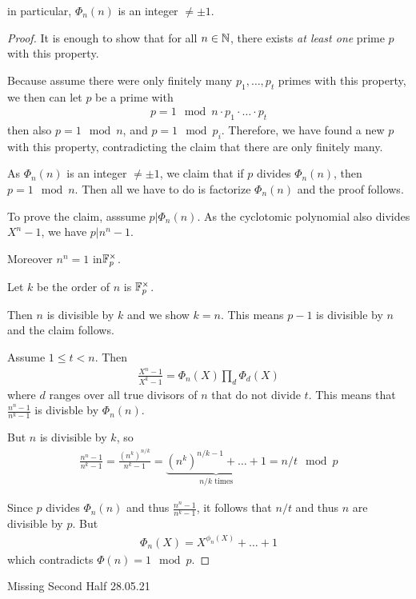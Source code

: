 in particular, $\Phi_n(n)$ is an integer $\neq \pm 1$.

\begin{proof}
It is enough to show that for all $n \in \mathbb{N}$, there exists \emph{at least one} prime $p$ with this property.

Because assume there were only finitely many $p_1,\ldots,p_t$ primes with this property, we then can let $p$ be a prime with
\begin{align*}
  p = 1 \mod n \cdot p_1 \cdot \ldots \cdot p_t
\end{align*}
then also $p = 1 \mod n$, and $p = 1 \mod p_i$.
Therefore, we have found a new $p$ with this property, contradicting the claim that there are only finitely many.

As $\Phi_n(n)$ is an integer $\neq \pm 1$, we claim that if $p$ divides $\Phi_n(n)$, then
$p = 1 \mod n$.
Then all we have to do is factorize $\Phi_n(n)$ and the proof follows.

To prove the claim, asssume $p | \Phi_n(n)$. As the cyclotomic polynomial also divides $X^{n}-1$, we have $p | n^{n} -1$.

Moreover $n^{n} = 1$ in$\mathbb{F}_p^{\times}$.

Let $k$ be the order of $n$ is $\mathbb{F}_p^{\times}$.

Then $n$ is divisible by $k$ and we show $k = n$.
This means $p-1$ is divisible by $n$ and the claim follows.

Assume $1 \leq t < n$. Then
\begin{align*}
  \frac{X^{n}-1}{X^{k}-1} = \Phi_n(X) \prod_{d} \Phi_d(X)
\end{align*}
where $d$ ranges over all true divisors of $n$ that do not divide $t$.
This means that
$\frac{n^{n}-1}{n^{k}-1}$ is divisble by $\Phi_n(n)$.

But $n$ is divisible by $k$, so
\begin{align*}
  \frac{n^{n}-1}{n^{k}-1} = \frac{(n^{k})^{n/k}}{n^{k}-1}= \underbrace{(n^{k})^{n/k - 1} + \ldots + 1}_{n/k \text{ times}}
  = n/t \mod p
\end{align*}

Since $p$ divides $\Phi_n(n)$ and thus $\frac{n^{n}-1}{n^{k}-1}$, it follows that $n/t$ and thus $n$ are divisible by $p$.
But
\begin{align*}
  \Phi_n(X) = X^{\phi_n(X)} + \ldots + 1
\end{align*}
which contradicts $\Phi(n) = 1 \mod p$.
\end{proof}


\begin{center}
Missing Second Half 28.05.21
\end{center}

